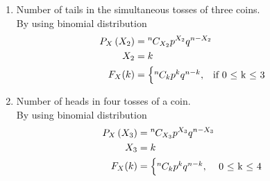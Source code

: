 \documentclass{article}
\providecommand{\brak}[1]{\ensuremath{\left(#1\right)}}
\newcommand*{\permcomb}[4][0mu]{{{}^{#3}\mkern#1#2_{#4}}}
\newcommand*{\comb}[1][-1mu]{\permcomb[#1]{C}}
\begin{document}
\begin{enumerate}[label=13.\arabic{enumi}.\arabic{enumii}]
\begin{enumerate}
\item Number of tails in the simultaneous tosses of three coins.\\
 By using binomial distribution\\
 \begin{align}
 P_X\brak{X_2} &= \comb{n}{X_2}p^{X_2}q^{n-X_2}\\
 X_2 &= k\\
  F_X(k) &=
    \begin{cases}
      \comb{n}{k}p^{k}q^{n-k}, & \text{if  0 $\leq$ k $\leq$ 3}\\
    \end{cases}       
\end{align}
\item Number of heads in four tosses of a coin.\\
 By using binomial distribution\\
 \begin{align}
 P_X\brak{X_3} &= \comb{n}{X_3}p^{X_3}q^{n-X_3}\\
 X_3 &= k\\
  F_X(k) &=
    \begin{cases}
      \comb{n}{k}p^{k}q^{n-k}, & \text{  0 $\leq$ k $\leq$ 4}\\
    \end{cases}       
\end{align}
\end{enumerate}
\end{enumerate}
\end{document}

